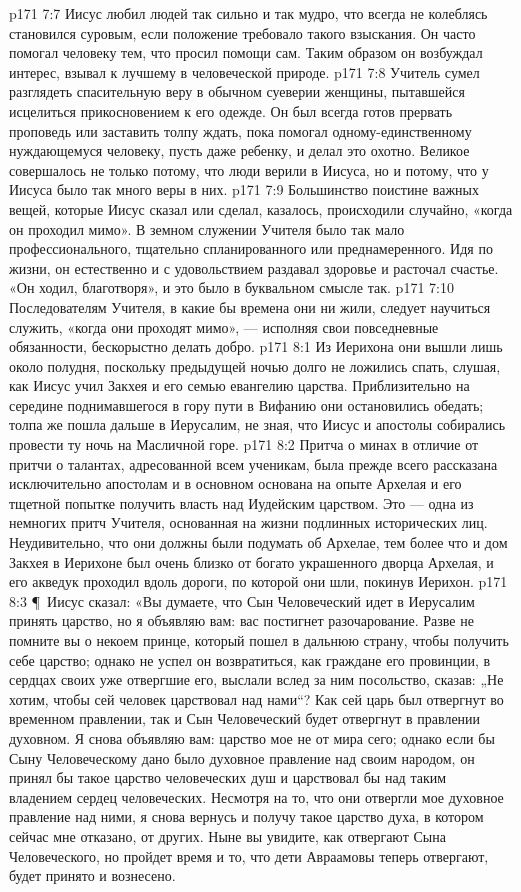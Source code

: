 \vs p171 7:7 Иисус любил людей так сильно и так мудро, что всегда не колеблясь становился суровым, если положение требовало такого взыскания. Он часто помогал человеку тем, что просил помощи сам. Таким образом он возбуждал интерес, взывал к лучшему в человеческой природе.
\vs p171 7:8 Учитель сумел разглядеть спасительную веру в обычном суеверии женщины, пытавшейся исцелиться прикосновением к его одежде. Он был всегда готов прервать проповедь или заставить толпу ждать, пока помогал одному\hyp{}единственному нуждающемуся человеку, пусть даже ребенку, и делал это охотно. Великое совершалось не только потому, что люди верили в Иисуса, но и потому, что у Иисуса было так много веры в них.
\vs p171 7:9 Большинство поистине важных вещей, которые Иисус сказал или сделал, казалось, происходили случайно, «когда он проходил мимо». В земном служении Учителя было так мало профессионального, тщательно спланированного или преднамеренного. Идя по жизни, он естественно и с удовольствием раздавал здоровье и расточал счастье. «Он ходил, благотворя», и это было в буквальном смысле так.
\vs p171 7:10 Последователям Учителя, в какие бы времена они ни жили, следует научиться служить, «когда они проходят мимо», --- исполняя свои повседневные обязанности, бескорыстно делать добро.
\vs p171 8:1 Из Иерихона они вышли лишь около полудня, поскольку предыдущей ночью долго не ложились спать, слушая, как Иисус учил Закхея и его семью евангелию царства. Приблизительно на середине поднимавшегося в гору пути в Вифанию они остановились обедать; толпа же пошла дальше в Иерусалим, не зная, что Иисус и апостолы собирались провести ту ночь на Масличной горе.
\vs p171 8:2 Притча о минах в отличие от притчи о талантах, адресованной всем ученикам, была прежде всего рассказана исключительно апостолам и в основном основана на опыте Архелая и его тщетной попытке получить власть над Иудейским царством. Это --- одна из немногих притч Учителя, основанная на жизни подлинных исторических лиц. Неудивительно, что они должны были подумать об Архелае, тем более что и дом Закхея в Иерихоне был очень близко от богато украшенного дворца Архелая, и его акведук проходил вдоль дороги, по которой они шли, покинув Иерихон.
\vs p171 8:3 \P\ Иисус сказал: «Вы думаете, что Сын Человеческий идет в Иерусалим принять царство, но я объявляю вам: вас постигнет разочарование. Разве не помните вы о некоем принце, который пошел в дальнюю страну, чтобы получить себе царство; однако не успел он возвратиться, как граждане его провинции, в сердцах своих уже отвергшие его, выслали вслед за ним посольство, сказав: „Не хотим, чтобы сей человек царствовал над нами“? Как сей царь был отвергнут во временном правлении, так и Сын Человеческий будет отвергнут в правлении духовном. Я снова объявляю вам: царство мое не от мира сего; однако если бы Сыну Человеческому дано было духовное правление над своим народом, он принял бы такое царство человеческих душ и царствовал бы над таким владением сердец человеческих. Несмотря на то, что они отвергли мое духовное правление над ними, я снова вернусь и получу такое царство духа, в котором сейчас мне отказано, от других. Ныне вы увидите, как отвергают Сына Человеческого, но пройдет время и то, что дети Авраамовы теперь отвергают, будет принято и вознесено.
